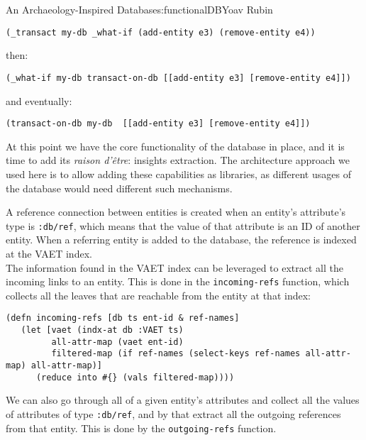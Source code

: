 \begin{aosachapter}{An Archaeology-Inspired Database}{s:functionalDB}{Yoav Rubin}
\begin{verbatim}
(_transact my-db _what-if (add-entity e3) (remove-entity e4))
\end{verbatim}

then:

\begin{verbatim}
(_what-if my-db transact-on-db [[add-entity e3] [remove-entity e4]])
\end{verbatim}

and eventually:

\begin{verbatim}
(transact-on-db my-db  [[add-entity e3] [remove-entity e4]])
\end{verbatim}

\label{insight-extraction-as-libraries}

At this point we have the core functionality of the database in place,
and it is time to add its \emph{raison d'être}: insights extraction. The
architecture approach we used here is to allow adding these capabilities
as libraries, as different usages of the database would need different
such mechanisms.

\label{graph-traversal}

A reference connection between entities is created when an entity's
attribute's type is \texttt{:db/ref}, which means that the value of that
attribute is an ID of another entity. When a referring entity is added
to the database, the reference is indexed at the VAET index.\\The
information found in the VAET index can be leveraged to extract all the
incoming links to an entity. This is done in the \texttt{incoming-refs}
function, which collects all the leaves that are reachable from the
entity at that index:

\begin{verbatim}
(defn incoming-refs [db ts ent-id & ref-names]
   (let [vaet (indx-at db :VAET ts)
         all-attr-map (vaet ent-id)
         filtered-map (if ref-names (select-keys ref-names all-attr-map) all-attr-map)]
      (reduce into #{} (vals filtered-map))))
\end{verbatim}

We can also go through all of a given entity's attributes and collect
all the values of attributes of type \texttt{:db/ref}, and by that
extract all the outgoing references from that entity. This is done by
the \texttt{outgoing-refs} function.


\end{aosachapter}
